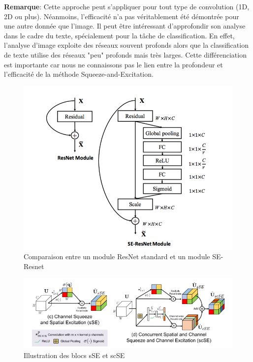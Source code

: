 \noindent \textbf{Remarque}: Cette approche peut s'appliquer pour tout type de convolution (1D, 2D ou plus). Néanmoins, l'efficacité n'a pas véritablement été démontrée pour une autre donnée que l'image. Il peut être intéressant d'approfondir son analyse dans le cadre du texte, spécialement pour la tâche de classification. En effet, l'analyse d'image exploite des réseaux souvent profonds alors que la classification de texte utilise des réseaux "peu" profonds mais très larges. Cette différenciation est importante car nous ne connaissons pas le lien entre la profondeur et l'efficacité de la méthode Squeeze-and-Excitation.

\begin{figure}
    \centering
    \includegraphics[scale=0.3]{./tex/attention-deep-learning/seres.png}
    \caption{Comparaison entre un module ResNet standard et un module SE-Resnet}
    \label{seres}
\end{figure}

\begin{figure}
    \centering
    \includegraphics[scale=0.4]{./tex/attention-deep-learning/cse.png}
    \caption{Illustration des blocs sSE et scSE}
    \label{sse}
\end{figure}
